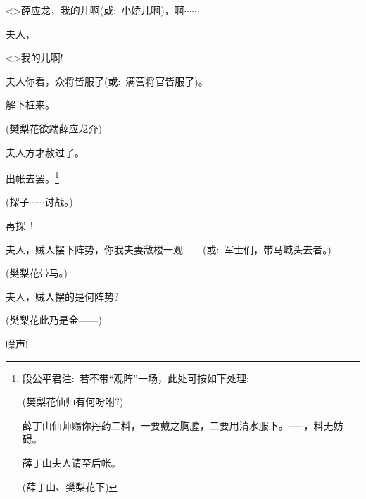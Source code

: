 {

\textless{}\!\textgreater{}薛应龙，我的儿啊({\akai 或}:~小娇儿啊)，啊$\cdots{}\cdots{}$

夫人，

\textless{}\!\textgreater{}我的儿啊!

夫人你看，众将皆服了({\akai 或}:~满营将官皆服了)。


解下桩来。

(樊梨花{\hwfs 欲踹}薛应龙{\hwfs 介})

夫人方才赦过了。

出帐去罢。\footnote{段公平{\scriptsize 君}注:~若不带``{观阵}''一场，此处可按如下处理:~

\hspace*{-2pt}(樊梨花\hspace{18pt}仙师有何吩咐?)

薛丁山\hspace{20pt}仙师赐你丹药二料，一要戴之胸膛，二要用清水服下。$\cdots{}\cdots{}$，料无妨碍。

薛丁山\hspace{20pt}夫人请至后帐。

\hspace*{-2pt}(薛丁山、樊梨花{\hwfs 下}) }

(探子\hspace{30pt}$\cdots{}\cdots{}$讨战。)

再探~!

夫人，贼人摆下阵势，你我夫妻敌楼一观------({\akai 或}:~军士们，带马城头去者。)

(樊梨花\hspace{20pt}带马。)



夫人，贼人摆的是何阵势?

(樊梨花\hspace{20pt}此乃是金------)

噤声!


}
